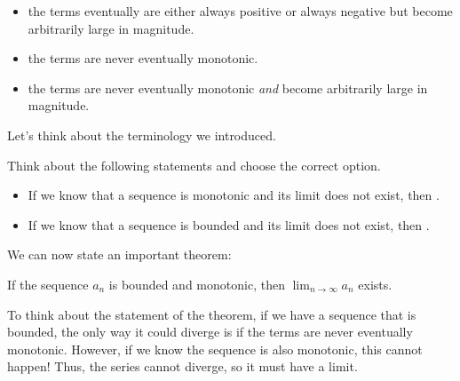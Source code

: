 \documentclass{ximera}
\begin{document}
\begin{itemize}
\item the terms eventually are either always positive or always negative but become arbitrarily large in magnitude.
\item the terms are never eventually monotonic.
\item the terms are never eventually monotonic \emph{and} become arbitrarily large in magnitude.
\end{itemize}

Let's think about the terminology we introduced.

\begin{question}
Think about the following statements and choose the correct option.
\begin{itemize}
\item If we know that a sequence is monotonic and its limit does not exist, then  .

\item If we know that a sequence is bounded and its limit does not exist, then  .

\end{itemize}
\end{question}

We can now state an important theorem:

\begin{theorem}
  If the sequence $a_n$ is bounded and monotonic, then $\lim_{n \to  \infty} a_n $ exists.
\end{theorem}

To think about the statement of the theorem, if we have a sequence that is bounded, the only way it could diverge is if the terms are never eventually monotonic.  However, if we know the sequence is also monotonic, this cannot happen!  Thus, the series cannot diverge, so it must have a limit.
\end{document}
